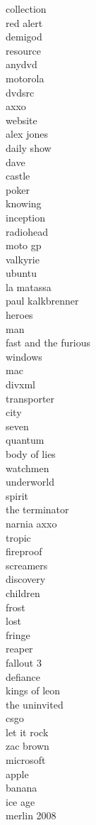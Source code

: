 \begin{multicols}{5}
	collection\\
	red alert\\
	demigod\\
	resource\\
	anydvd\\
	motorola\\
	dvdsrc\\
	axxo\\
	website\\
	alex jones\\
	daily show\\
	dave\\
	castle\\
	poker\\
	knowing\\
	inception\\
	radiohead\\
	moto gp\\
	valkyrie\\
	ubuntu\\
	la matassa\\
	paul kalkbrenner\\
	heroes\\
	man\\
	fast and the furious\\
	windows\\
	mac\\
	divxml\\
	transporter\\
	city\\
	seven\\
	quantum\\
	body of lies\\
	watchmen\\
	underworld\\
	spirit\\
	the terminator\\
	narnia axxo\\
	tropic\\
	fireproof\\
	screamers\\
	discovery\\
	children\\
	frost\\
	lost\\
	fringe\\
	reaper\\
	fallout 3\\
	defiance\\
	kings of leon\\
	the uninvited\\
	csgo\\
	let it rock\\
	zac brown\\
	microsoft\\
	apple\\
	banana\\
	ice age\\
	merlin 2008\\
	
\end{multicols}

